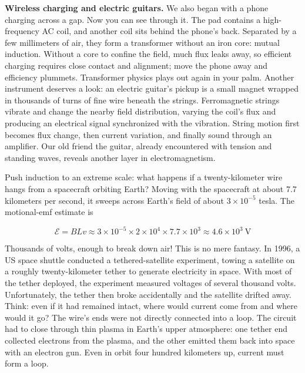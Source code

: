 \textbf{Wireless charging and electric guitars.} We also began with a phone charging across a gap. Now you can see through it. The pad contains a high-frequency AC coil, and another coil sits behind the phone's back. Separated by a few millimeters of air, they form a transformer without an iron core: mutual induction. Without a core to confine the field, much flux leaks away, so efficient charging requires close contact and alignment; move the phone away and efficiency plummets. Transformer physics plays out again in your palm. Another instrument deserves a look: an electric guitar's pickup is a small magnet wrapped in thousands of turns of fine wire beneath the strings. Ferromagnetic strings vibrate and change the nearby field distribution, varying the coil's flux and producing an electrical signal synchronized with the vibration. String motion first becomes flux change, then current variation, and finally sound through an amplifier. Our old friend the guitar, already encountered with tension and standing waves, reveals another layer in electromagnetism.


\begin{thought}
Push induction to an extreme scale: what happens if a twenty-kilometer wire hangs from a spacecraft orbiting Earth? Moving with the spacecraft at about 7.7 kilometers per second, it sweeps across Earth's field of about \(3\times10^{-5}\) tesla. The motional-emf estimate is

\[
\mathcal{E}=BLv\approx 3\times10^{-5}\times2\times10^{4}\times7.7\times10^{3}\approx 4.6\times10^{3}\ \mathrm{V}
\]

Thousands of volts, enough to break down air! This is no mere fantasy. In 1996, a US space shuttle conducted a tethered-satellite experiment, towing a satellite on a roughly twenty-kilometer tether to generate electricity in space. With most of the tether deployed, the experiment measured voltages of several thousand volts. Unfortunately, the tether then broke accidentally and the satellite drifted away. Think: even if it had remained intact, where would current come from and where would it go? The wire's ends were not directly connected into a loop. The circuit had to close through thin plasma in Earth's upper atmosphere: one tether end collected electrons from the plasma, and the other emitted them back into space with an electron gun. Even in orbit four hundred kilometers up, current must form a loop.
\end{thought}

